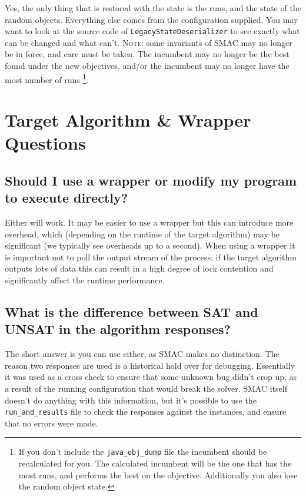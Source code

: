 \documentclass[11pt,letterpaper,oneside]{article}
\begin{document}
	Yes, the only thing that is restored with the state is the runs, and the state of the random objects. Everything else comes from the configuration supplied. You may want to look at the source code of \texttt{LegacyStateDeserializer} to see exactly what can be changed and what can't. \textsc{Note:} some invariants of SMAC may no longer be in force, and care must be taken. The incumbent may no longer be the best found under the new objectives, and/or the incumbent may no longer have the most number of runs \footnote{If you don't include the \texttt{java\_obj\_dump} file the incumbent should be recalculated for you. The calculated incumbent will be the one that has the most runs, and performs the best on the objective. Additionally you also lose the random object state.}. 

\section{Target Algorithm \& Wrapper Questions}

\subsection{Should I use a wrapper or modify my program to execute directly?} 

	Either will work. It may be easier to use a wrapper but this can introduce more overhead, which (depending on the runtime of the target algorithm) may be significant (we typically see overheads up to a second). When using a wrapper it is important not to poll the output stream of the process: if the target algorithm outputs lots of data this can result in a high degree of lock contention and significantly affect the runtime performance.
	

\subsection{What is the difference between SAT and UNSAT in the algorithm responses?}

The short answer is you can use either, as SMAC makes no distinction. The reason two responses are used is a historical hold over for debugging. Essentially it was used as a cross check to ensure that some unknown bug didn't crop up, as a result of the running configuration that would break the solver. SMAC itself doesn't do anything with this information, but it's possible to use the \texttt{run\_and\_results} file to check the responses against the instances, and ensure that no errors were made.
\end{document}
